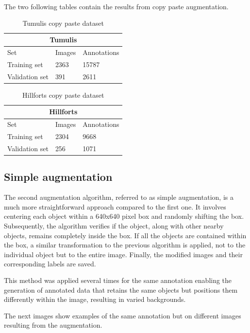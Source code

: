 The two following tables contain the results from copy paste augmentation.

\begin{table}[H]
\centering
\begin{tabular}{|p{3cm}|p{2.5cm}|p{2cm}|} 
\hline
\multicolumn{3}{|c|}{Tumulis} \\
 \hline
  Set & Images & Annotations\\ [0.5ex] 
 \hline
 Training set & 2363 & 15787 \\ 
 Validation set & 391 & 2611  \\[1ex]
 \hline
\end{tabular}
\caption{Tumulis copy paste dataset}
\end{table} 

\begin{table}[H]
\centering
\begin{tabular}{|p{3cm}|p{2.5cm}|p{2cm}|} 
\hline
\multicolumn{3}{|c|}{Hillforts} \\
 \hline
  Set & Images & Annotations\\ [0.5ex] 
 \hline
 Training set & 2304 & 9668 \\ 
 Validation set & 256 & 1071  \\[1ex]
 \hline
\end{tabular}
\caption{Hillforts copy paste dataset}
\end{table} 


\subsection{Simple augmentation}
The second augmentation algorithm, referred to as simple augmentation, is a much more straightforward approach compared to the first one. It involves centering each object within a 640x640 pixel box and randomly shifting the box. Subsequently, the algorithm verifies if the object, along with other nearby objects, remains completely inside the box. If all the objects are contained within the box, a similar transformation to the previous algorithm is applied, not to the individual object but to the entire image. Finally, the modified images and their corresponding labels are saved.

This method was applied several times for the same annotation enabling the generation of annotated data that retains the same objects but positions them differently within the image, resulting in varied backgrounds.

The next images show examples of the same annotation but on different images resulting from the augmentation.

